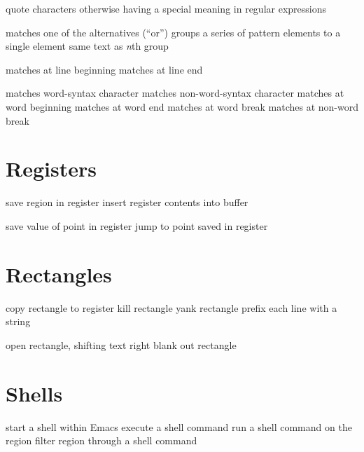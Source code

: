  quote characters otherwise having a special
  meaning in regular expressions

\key{$\ldots$\\|$\ldots$\\|$\ldots$} matches one of
  the alternatives (``or'')
\key{\\( $\ldots$ \\)} groups a series of pattern elements to
  a single element
 same text as {\it n\/}th group

\key{\^{}} matches at line beginning
\key{\$} matches at line end

\key{\\w} matches word-syntax character
\key{\\W} matches non-word-syntax character
\key{\\<} matches at word beginning
\key{\\>} matches at word end
\key{\\b} matches at word break
\key{\\B} matches at non-word break

\section{Registers}

 save region in register
 insert register contents into buffer

 save value of point in register
 jump to point saved in register

\section{Rectangles}

 copy rectangle to register
 kill rectangle
 yank rectangle
 prefix each line with a string

 open rectangle, shifting text right
 blank out rectangle

\section{Shells}

 start a shell within Emacs
 execute a shell command
 run a shell command on the region
 filter region through a shell command

